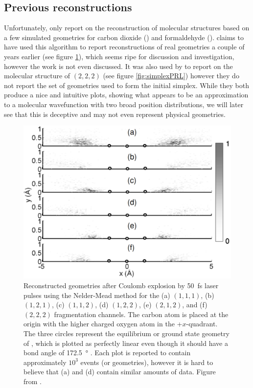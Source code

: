 \subsection{Previous reconstructions}
Unfortunately, \citet{Brichta09} only report on the reconstruction of molecular structures based on a few simulated geometries for carbon dioxide () and formaldehyde (). \citet{Brichta07} claims to have used this algorithm to report reconstructions of real  geometries a couple of years earlier (see figure \ref{fig:simplexJPhysB}), which seems ripe for discussion and investigation, however the work is not even discussed. It was also used by \citet{Bocharova11} to report on the molecular structure of  $(2,2,2)$ (see figure \ref{fig:simplexPRL}) however they do not report the set of geometries used to form the initial simplex. While they both produce a nice and intuitive plots, showing what appears to be an approximation to a molecular wavefunction with two broad position distributions, we will later see that this is deceptive and may not even represent physical geometries. 

\begin{figure}
  \centering
  \includegraphics[width=\textwidth]{gfx/SimplexJPhysB}
  \caption[Reconstructed  geometries using the Nelder-Mead method.]
  {Reconstructed  geometries after Coulomb explosion by \SI{50}{\fs} laser pulses using the Nelder-Mead method for the (a) $(1,1,1)$, (b) $(1,2,1)$, (c) $(1,1,2)$, (d) $(1,2,2)$, (e) $(2,1,2)$, and (f) $(2,2,2)$ fragmentation channels. The carbon atom is placed at the origin with the higher charged oxygen atom in the +$x$-quadrant. The three circles represent the equilibrium or ground state geometry of , which is plotted as perfectly linear even though it should have a bond angle of \SI{172.5}{\degree} \citep{Siegmann02,Mathur92}. Each plot is reported to contain approximately $10^3$ events (or geometries), however it is hard to believe that (a) and (d) contain similar amounts of data. Figure from \citet{Brichta07}.}
  \label{fig:simplexJPhysB}
\end{figure}

